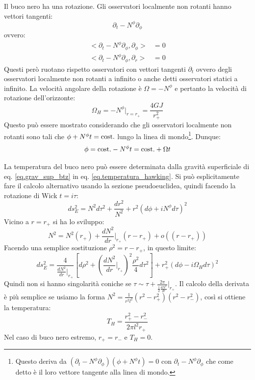 Il buco nero ha una rotazione. Gli osservatori localmente non rotanti hanno vettori tangenti:
\begin{equation*}
    \partial_t - N^\phi\partial_\phi
\end{equation*}
ovvero:
\begin{align*}
    <\partial_t - N^\phi\partial_\phi, \partial_\phi > &= 0 \\
    <\partial_t - N^\phi\partial_\phi, \partial_r > &= 0
\end{align*}
Questi però ruotano rispetto osservatori con vettori tangenti  $\partial_t$ ovvero degli osservatori localmente non rotanti a infinito o anche detti osservatori statici a infinito. La velocità angolare della rotazione è $\Omega = -N^\phi$ e pertanto la velocità di rotazione dell'orizzonte:
\begin{equation}
    \Omega_H = - N^\phi\Big|_{r=r_+} = \frac{4GJ}{r_+^2}
\end{equation}
Questo può essere mostrato considerando che gli osservatori localmente non rotanti sono tali che $\phi + N^\phi t = \textrm{cost.}$ lungo la linea di mondo\footnote{Questo deriva da $(\partial_t - N^\phi\partial_\phi)(\phi + N^\phi t) = 0$ con $\partial_t - N^\phi\partial_\phi$ che come detto è il loro vettore tangente alla linea di mondo.}. Dunque:
\begin{equation*}
    \phi = \textrm{cost.} - N^\phi t = \textrm{cost.} + \Omega t
\end{equation*}

La temperatura del buco nero può essere determinata dalla gravità superficiale di eq. \ref{eq.grav_sup_btz} in eq. \ref{eq.temperatura_hawking}. Si può esplicitamente fare il calcolo alternativo usando la sezione pseudoeuclidea, quindi facendo la rotazione di Wick $t = i\tau$:
\begin{equation*}
    ds_E^2= N^2d\tau^2 + \frac{dr^2}{N^2} + r^2(d\phi +iN^\phi d\tau)^2
\end{equation*}
Vicino a $r=r_+$ si ha lo sviluppo:
\begin{equation*}
    N^2 = N^2(r_+) + \frac{dN^2}{dr}\Big|_{r_+}(r-r_+) + o((r-r_+))
\end{equation*}
Facendo una semplice sostituzione $\rho^2 = r-r_+$, in questo limite:
\begin{equation*}
    ds_E^2 = \frac{4}{\frac{dN^2}{dr}\Big|_{r_+}}\left[ d\rho^2 + \left(\frac{dN^2}{dr}\Big|_{r_+}\right)^2\frac{\rho^2}{4} d\tau^2\right] + r_+^2(d\phi - i\Omega_H d\tau)^2
\end{equation*}
Quindi non si hanno singolarità coniche se $\tau \sim \tau + \frac{2\pi}{\frac{1}{2}\frac{dN^2}{dr}}\Big|_{r_+}$. Il calcolo della derivata è più semplice se usiamo la forma $N^2= \frac{1}{r^2l^2}(r^2-r_+^2)(r^2-r_-^2)$, così si ottiene la temperatura:
\begin{equation}
    T_H = \frac{r_+^2 - r_-^2}{2\pi l^2r_+}
    \label{eq.temp_btz}
\end{equation}
Nel caso di buco nero estremo, $r_+ = r_-$ e $T_H=0$.

